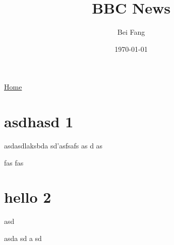 \documentclass[11pt]{article}
\author{Bei Fang}
\date{\today}
\title{BBC News}
\begin{document}
\maketitle
\tableofcontents

\href{https://adeepmind.github.io/index.html}{Home}

\section{asdhasd 1}
\label{sec:org706e877}
asdasdlaksbda
sd'asfsafs
as
d
as

fas
fas

\section{hello 2}
\label{sec:orgf5bf963}
asd


asda
sd
a
sd
\end{document}
